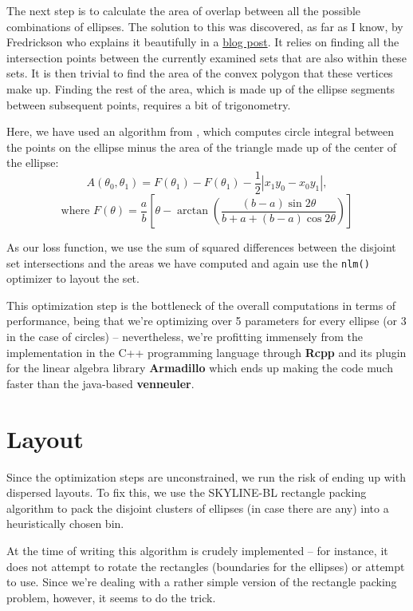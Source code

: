 \documentclass[
  headsepline=true,headings=standardclasses%
]{scrartcl}
\theoremstyle{definition}
\theoremstyle{definition}
\theoremstyle{definition}
\theoremstyle{remark}
\begin{document}
The next step is to calculate the area of overlap between all the
possible combinations of ellipses. The solution to this was discovered,
as far as I know, by Fredrickson who explains it beautifully in a
\href{http://www.benfrederickson.com/calculating-the-intersection-of-3-or-more-circles/}{blog
post}. It relies on finding all the intersection points between the
currently examined sets that are also within these sets. It is then
trivial to find the area of the convex polygon that these vertices make
up. Finding the rest of the area, which is made up of the ellipse
segments between subsequent points, requires a bit of trigonometry.

Here, we have used an algorithm from \textcite{eberly_area_2016}, which
computes circle integral between the points on the ellipse minus the
area of the triangle made up of the center of the ellipse: \[
A(\theta_0, \theta_1) = F(\theta_1) - F(\theta_1) -
\frac{1}{2}|x_1y_0 - x_0y_1|,
\] \[
\text{where } F(\theta) = \frac{a}{b}\left[ \theta -
\arctan{\left(\frac{(b - a)\sin{2\theta}}{b + a +(b - a )\cos{2\theta}} \right)}
\right]
\]

As our loss function, we use the sum of squared differences between the
disjoint set intersections and the areas we have computed and again use
the \texttt{nlm()} optimizer to layout the set.

This optimization step is the bottleneck of the overall computations in
terms of performance, being that we're optimizing over 5 parameters for
every ellipse (or 3 in the case of circles) -- nevertheless, we're
profitting immensely from the implementation in the C++ programming
language through \textbf{Rcpp} \autocite{eddelbuettel_2011} and its
plugin for the linear algebra library \textbf{Armadillo}
\autocite{eddelbuettel_2014} which ends up making the code much faster
than the java-based \textbf{venneuler}.

\section{Layout}\label{layout}

Since the optimization steps are unconstrained, we run the risk of
ending up with dispersed layouts. To fix this, we use the SKYLINE-BL
rectangle packing algorithm \autocite{jylanki_2010} to pack the disjoint
clusters of ellipses (in case there are any) into a heuristically chosen
bin.

At the time of writing this algorithm is crudely implemented -- for
instance, it does not attempt to rotate the rectangles (boundaries for
the ellipses) or attempt to use. Since we're dealing with a rather
simple version of the rectangle packing problem, however, it seems to do
the trick.
\end{document}
